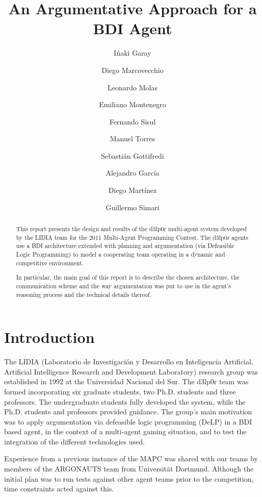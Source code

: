\documentclass{llncs2e/llncs}
\title{An Argumentative Approach for a BDI Agent} %
\author{I\~{n}aki Garay \and      %
        Diego Marcovecchio \and   %
        Leonardo Molas \and       %
        Emiliano Montenegro \and  %
        Fernando Sisul \and       %
        Manuel Torres \and        %
        Sebastián Gottifredi \and %
        Alejandro García \and     %
        Diego Martínez \and       %
        Guillermo Simari          %
        }
\institute{Universidad Nacional del Sur}
\begin{document}
\maketitle

\begin{abstract}
    This report presents the design and results of the d3lp0r multi-agent system 
    developed by the LIDIA team for the 2011 Multi-Agent Programming Contest.
    The d3lp0r agents use a BDI architecture extended with planning and 
    argumentation (via Defeasible Logic Programming) to model a cooperating team 
    operating in a dynamic and competitive environment.

    In particular, the main goal of this report is to describe the chosen 
    architecture, the communication scheme and the way argumentation was put to 
    use in the agent's reasoning process and the technical details thereof.
\end{abstract}

\section{Introduction}

    The LIDIA (Laboratorio de Investigación y Desarrollo en Inteligencia 
    Artificial, Artificial Intelligence Research and Development Laboratory) 
    research group was established in 1992 at the Universidad Nacional del Sur. 
    The d3lp0r team was formed incorporating six graduate students, two Ph.D. 
    students and three professors. The undergraduate students fully developed the 
    system, while the Ph.D. students and professors provided guidance. The group's 
    main motivation was to apply argumentation via defeasible logic programming 
    (DeLP) in a BDI based agent, in the context of a multi-agent gaming situation, 
    and to test the integration of the different technologies used.

    Experience from a previous instance of the MAPC was shared with our teams by 
    members of the ARGONAUTS team from Universität Dortmund. Although the initial 
    plan was to run tests against other agent teams prior to the competition, time 
    constraints acted against this.
\end{document}
